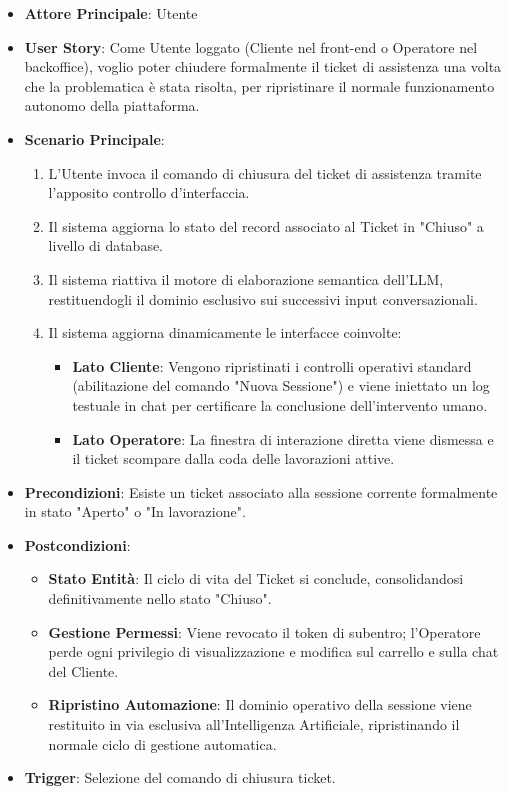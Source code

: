 \begin{itemize}
    \item \textbf{Attore Principale}: Utente
    \item \textbf{User Story}: Come Utente loggato (Cliente nel front-end o Operatore nel backoffice), voglio poter chiudere formalmente il ticket di assistenza una volta che la problematica è stata risolta, per ripristinare il normale funzionamento autonomo della piattaforma.
    \item \textbf{Scenario Principale}:
    \begin{enumerate}
        \item L'Utente invoca il comando di chiusura del ticket di assistenza tramite l'apposito controllo d'interfaccia.
        \item Il sistema aggiorna lo stato del record associato al Ticket in "Chiuso" a livello di database.
        \item Il sistema riattiva il motore di elaborazione semantica dell'LLM, restituendogli il dominio esclusivo sui successivi input conversazionali.
        \item Il sistema aggiorna dinamicamente le interfacce coinvolte:
        \begin{itemize}
            \item \textbf{Lato Cliente}: Vengono ripristinati i controlli operativi standard (abilitazione del comando "Nuova Sessione") e viene iniettato un log testuale in chat per certificare la conclusione dell'intervento umano.
            \item \textbf{Lato Operatore}: La finestra di interazione diretta viene dismessa e il ticket scompare dalla coda delle lavorazioni attive.
        \end{itemize}
    \end{enumerate}
    \item \textbf{Precondizioni}: Esiste un ticket associato alla sessione corrente formalmente in stato "Aperto" o "In lavorazione".
    \item \textbf{Postcondizioni}: 
    \begin{itemize}
        \item \textbf{Stato Entità}: Il ciclo di vita del Ticket si conclude, consolidandosi definitivamente nello stato "Chiuso".
        \item \textbf{Gestione Permessi}: Viene revocato il token di subentro; l'Operatore perde ogni privilegio di visualizzazione e modifica sul carrello e sulla chat del Cliente.
        \item \textbf{Ripristino Automazione}: Il dominio operativo della sessione viene restituito in via esclusiva all'Intelligenza Artificiale, ripristinando il normale ciclo di gestione automatica.
    \end{itemize}
    \item \textbf{Trigger}: Selezione del comando di chiusura ticket.
\end{itemize}

